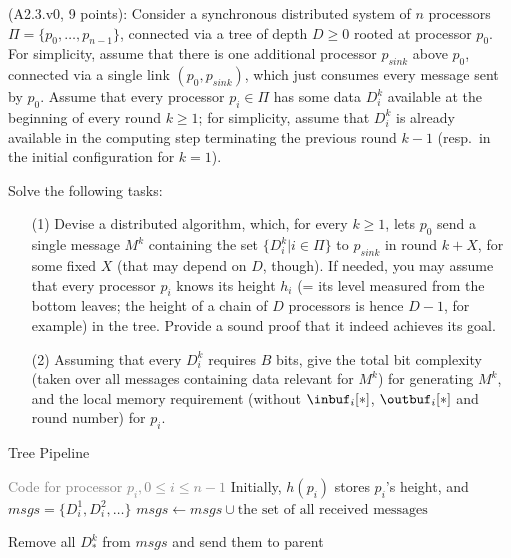 
\begin{Exc}{(A2.3.v0, 9 points):}
Consider a synchronous distributed system of $n$ processors
$\Pi=\{p_0,\dots,p_{n-1}\}$, connected via a tree of depth $D\geq0$
rooted at processor $p_0$. For simplicity, assume that there is
one additional processor $p_{sink}$ above $p_0$, connected via a single link
$(p_0,p_{sink})$, which just consumes every message sent by $p_0$.
Assume that every processor $p_i\in\Pi$ has
some data $D_i^k$ available at the beginning of every round $k\geq 1$;
for simplicity, assume that $D_i^k$ is already available in the
computing step terminating the previous round $k-1$ (resp.\
in the initial configuration for $k=1$).

Solve the following tasks:
\begin{enumerate}
\item[(1)] Devise a distributed algorithm, which, for every $k\geq 1$,
lets $p_0$ send a single message $M^k$ containing the set
$\{D_i^k| i\in\Pi\}$ to $p_{sink}$ in
round $k+X$, for some fixed $X$ (that may depend on $D$, though).
If needed, you may assume that every processor $p_i$ knows its
height $h_i$ (= its level measured from the bottom leaves;
the height of a chain of $D$ processors is hence $D-1$, for example) in
the tree. Provide a sound proof that it indeed achieves its
goal.

\item[(2)] Assuming that every $D_i^k$ requires $B$ bits,
give the total bit
complexity (taken over all messages containing data relevant for
$M^k$) for generating $M^k$, and the local memory requirement
(without $\inbuf_i[*]$, $\outbuf_i[*]$ and round number) for $p_i$.
\end{enumerate}
\end{Exc}

\begin{algorithm}
\caption{Tree Pipeline} \label{alg:tpipe}
\begin{algorithmic}[1]
\State \textcolor{Gray}{Code for processor $p_i, 0 \leq i \leq n - 1$}
\State Initially, $h(p_i)$ stores $p_i$'s height, and $msgs = \{ D_i^1, D_i^2, \ldots \}$
\For{each round $t$}
    \State $msgs \gets msgs \cup \text{the set of all received messages}$

        \State Remove all $D_*^k$ from $msgs$ and send them to parent
    \EndIf
\EndFor
\end{algorithmic}
\end{algorithm}


